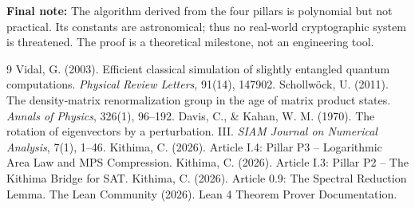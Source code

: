 \documentclass[11pt,a4paper]{article}
\begin{document}
\vspace{0.5cm}
\noindent\textbf{Final note:} The algorithm derived from the four pillars is polynomial but not practical. Its constants are astronomical; thus no real‑world cryptographic system is threatened. The proof is a theoretical milestone, not an engineering tool.


\begin{thebibliography}{9}
  Vidal, G. (2003). Efficient classical simulation of slightly entangled quantum computations. \emph{Physical Review Letters}, 91(14), 147902.
  Schollwöck, U. (2011). The density‑matrix renormalization group in the age of matrix product states. \emph{Annals of Physics}, 326(1), 96–192.
  Davis, C., \& Kahan, W. M. (1970). The rotation of eigenvectors by a perturbation. III. \emph{SIAM Journal on Numerical Analysis}, 7(1), 1–46.
  Kithima, C. (2026). Article I.4: Pillar P3 – Logarithmic Area Law and MPS Compression.
  Kithima, C. (2026). Article I.3: Pillar P2 – The Kithima Bridge for SAT.
  Kithima, C. (2026). Article 0.9: The Spectral Reduction Lemma.
  The Lean Community (2026). Lean 4 Theorem Prover Documentation.
\end{thebibliography}
\end{document}

